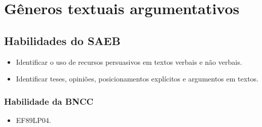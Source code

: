 
\chapter{Gêneros textuais argumentativos}

\section*{Habilidades do SAEB}

\begin{itemize}
\tightlist
\item
  Identificar o uso de recursos persuasivos em textos verbais e não
  verbais.
\item
  Identificar teses, opiniões, posicionamentos explícitos e argumentos
  em textos.
\end{itemize}

\subsection{Habilidade da BNCC}

\begin{itemize}
\tightlist
\item
  EF89LP04.
\end{itemize}

